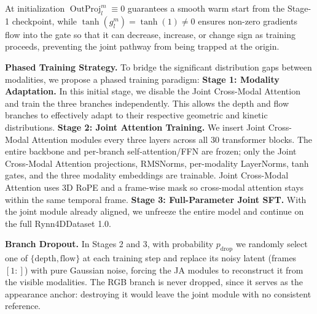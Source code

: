 At initialization $\operatorname{OutProj}_l^m \equiv 0$ guarantees a smooth warm start from the Stage-1 checkpoint, while $\tanh(g_l^m) = \tanh(1) \neq 0$ ensures non-zero gradients flow into the gate so that it can decrease, increase, or change sign as training proceeds, preventing the joint pathway from being trapped at the origin. 


\noindent 
\textbf{Phased Training Strategy.} 
To bridge the significant distribution gaps between modalities, we propose a phased training paradigm: 
\textbf{Stage 1: Modality Adaptation.} In this initial stage, we disable the Joint Cross-Modal Attention and train the three branches independently. This allows the depth and flow branches to effectively adapt to their respective geometric and kinetic distributions. 
\textbf{Stage 2: Joint Attention Training.} We insert Joint Cross-Modal Attention modules every three layers across all 30 transformer blocks. The entire backbone and per-branch self-attention/FFN are frozen; only the Joint Cross-Modal Attention projections, RMSNorms, per-modality LayerNorms, tanh gates, and the three modality embeddings are trainable. Joint Cross-Modal Attention uses 3D RoPE and a frame-wise mask so cross-modal attention stays within the same temporal frame.
\textbf{Stage 3: Full-Parameter Joint SFT.} With the joint module already aligned, we unfreeze the entire model and continue on the full Rynn4DDataset 1.0.

\noindent
\textbf{Branch Dropout.}
In Stages 2 and 3, with probability $p_{\text{drop}}$ we randomly select one of $\{\text{depth}, \text{flow}\}$ at each training step and replace its noisy latent (frames $[1{:}]$) with pure Gaussian noise, forcing the JA modules to reconstruct it from the visible modalities. The RGB branch is never dropped, since it serves as the appearance anchor: destroying it would leave the joint module with no consistent reference.


